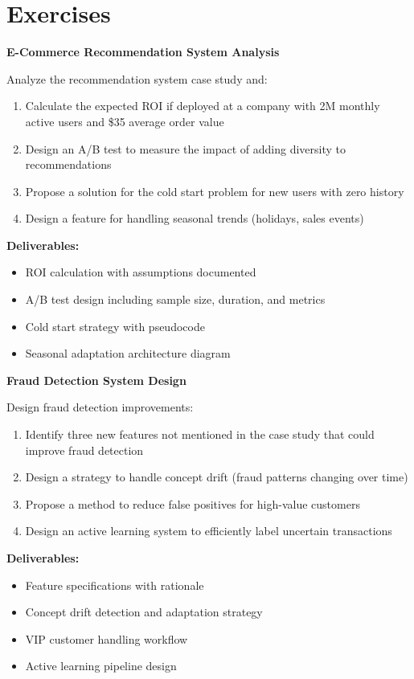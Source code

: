 \section{Exercises}

\begin{exercise}
\textbf{E-Commerce Recommendation System Analysis}

Analyze the recommendation system case study and:

\begin{enumerate}
    \item Calculate the expected ROI if deployed at a company with 2M monthly active users and \$35 average order value
    \item Design an A/B test to measure the impact of adding diversity to recommendations
    \item Propose a solution for the cold start problem for new users with zero history
    \item Design a feature for handling seasonal trends (holidays, sales events)
\end{enumerate}

\textbf{Deliverables:}
\begin{itemize}
    \item ROI calculation with assumptions documented
    \item A/B test design including sample size, duration, and metrics
    \item Cold start strategy with pseudocode
    \item Seasonal adaptation architecture diagram
\end{itemize}
\end{exercise}

\begin{exercise}
\textbf{Fraud Detection System Design}

Design fraud detection improvements:

\begin{enumerate}
    \item Identify three new features not mentioned in the case study that could improve fraud detection
    \item Design a strategy to handle concept drift (fraud patterns changing over time)
    \item Propose a method to reduce false positives for high-value customers
    \item Design an active learning system to efficiently label uncertain transactions
\end{enumerate}

\textbf{Deliverables:}
\begin{itemize}
    \item Feature specifications with rationale
    \item Concept drift detection and adaptation strategy
    \item VIP customer handling workflow
    \item Active learning pipeline design
\end{itemize}
\end{exercise}

